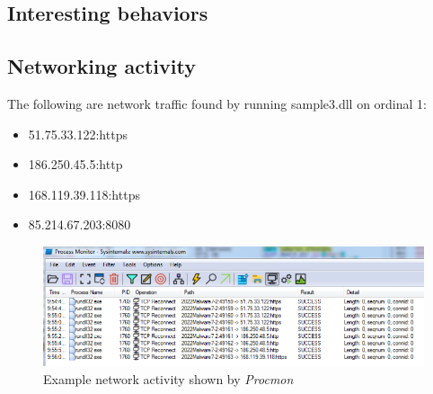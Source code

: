 \documentclass{article}
\begin{document}
    \subsection{Interesting behaviors}
    \subsection{Networking activity}
    The following are network traffic found by running sample3.dll on ordinal 1:
    \begin{itemize}
        \item 51.75.33.122:https
        \item 186.250.45.5:http
        \item 168.119.39.118:https
        \item 85.214.67.203:8080
    \end{itemize}
    \begin{figure}[H]
        \includegraphics[width=\textwidth]{networkProcmon.png}
        \caption{Example network activity shown by \textit{Procmon}}
    \end{figure}
\end{document}
